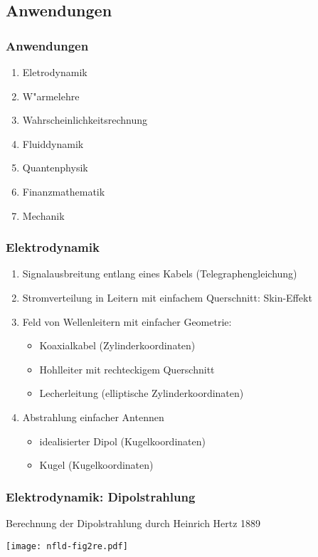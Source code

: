 \documentclass{beamer}
\begin{document}
\begin{frame}
\section{Anwendungen}
\frametitle{Anwendungen}
\begin{enumerate}
\item Eletrodynamik
\item W"armelehre
\item Wahrscheinlichkeitsrechnung
\item Fluiddynamik
\item Quantenphysik
\item Finanzmathematik
\item Mechanik
\end{enumerate}
\end{frame}

\begin{frame}
\frametitle{Elektrodynamik}
\begin{enumerate}
\item Signalausbreitung entlang eines Kabels (Telegraphengleichung)
\item Stromverteilung in Leitern mit einfachem Querschnitt:
Skin-Effekt
\item Feld von Wellenleitern mit einfacher Geometrie: 
\begin{itemize}
\item Koaxialkabel (Zylinderkoordinaten)
\item Hohlleiter mit rechteckigem Querschnitt
\item Lecherleitung (elliptische Zylinderkoordinaten)
\end{itemize}
\item Abstrahlung einfacher Antennen
\begin{itemize}
\item idealisierter Dipol (Kugelkoordinaten)
\item Kugel (Kugelkoordinaten)
\end{itemize}
\end{enumerate}
\end{frame}

\begin{frame}
\frametitle{Elektrodynamik: Dipolstrahlung}
Berechnung der Dipolstrahlung durch Heinrich Hertz 1889
\begin{center}
\texttt{[image: nfld-fig2re.pdf]}
\end{center}
\end{frame}
\end{document}
